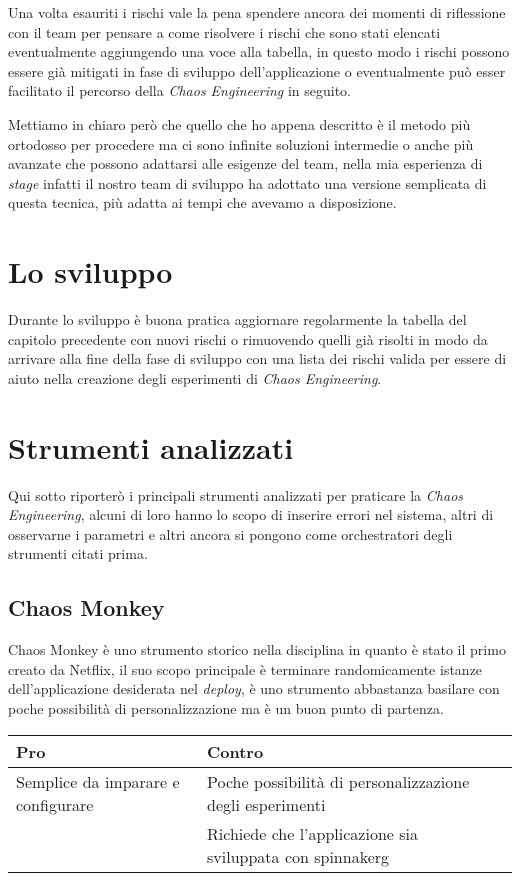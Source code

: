 Una volta esauriti i rischi vale la pena spendere ancora dei momenti di riflessione con il team per pensare a come risolvere i rischi che sono stati elencati eventualmente aggiungendo una voce alla tabella, in questo modo i rischi possono essere già mitigati in fase di sviluppo dell'applicazione o eventualmente può esser facilitato il percorso della \textit{Chaos Engineering} in seguito.

Mettiamo in chiaro però che quello che ho appena descritto è il metodo più ortodosso per procedere ma ci sono infinite soluzioni intermedie o anche più avanzate che possono adattarsi alle esigenze del team, nella mia esperienza di \textit{stage} infatti il nostro team di sviluppo ha adottato una versione semplicata di questa tecnica, più adatta ai tempi che avevamo a disposizione.

\section{Lo sviluppo}
Durante lo sviluppo è buona pratica aggiornare regolarmente la tabella del capitolo precedente con nuovi rischi o rimuovendo quelli già risolti in modo da arrivare alla fine della fase di sviluppo con una lista dei rischi valida per essere di aiuto nella creazione degli esperimenti di \textit{Chaos Engineering}.

\section{Strumenti analizzati}
Qui sotto riporterò i principali strumenti analizzati per praticare la \textit{Chaos Engineering}, alcuni di loro hanno lo scopo di inserire errori nel sistema, altri di osservarne i parametri e altri ancora si pongono come orchestratori degli strumenti citati prima.

\subsection{Chaos Monkey}
Chaos Monkey è uno strumento storico nella disciplina in quanto è stato il primo creato da Netflix, il suo scopo principale è terminare randomicamente istanze dell'applicazione desiderata nel \textit{deploy}, è uno strumento abbastanza basilare con poche possibilità di personalizzazione ma è un buon punto di partenza.
\begin{center}%
    \label{tab:chaos-monkey}
    \begin{tabularx}{\textwidth}{lXl}
    \hline\hline
    \textbf{Pro} & \textbf{Contro}\\
    \hline
    Semplice da imparare e configurare & Poche possibilità di personalizzazione degli esperimenti \\
     & Richiede che l'applicazione sia sviluppata con \gls{spinnakerg} \\
    \hline
    \end{tabularx}
\end{center}%


